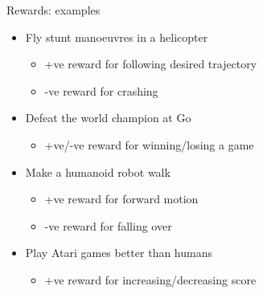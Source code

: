 \bgroup
\begin{frame}{Rewards: examples}
\begin{itemize}
\item Fly stunt manoeuvres in a helicopter
\begin{itemize}
\item +ve reward for following desired trajectory
\item -ve reward for crashing
\end{itemize}
\item Defeat the world champion at Go
\begin{itemize}
\item +ve/-ve reward for winning/losing a game
\end{itemize}
\item Make a humanoid robot walk
\begin{itemize}
\item +ve reward for forward motion
\item -ve reward for falling over
\end{itemize}
\item Play Atari games better than humans
\begin{itemize}
\item +ve reward for increasing/decreasing score
\end{itemize}
\end{itemize}
\end{frame}
\egroup